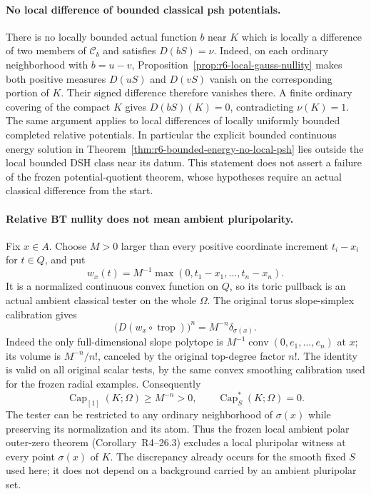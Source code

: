 \documentclass[11pt,a4paper]{article}
\numberwithin{equation}{section}
\theoremstyle{definition}
\theoremstyle{remark}
\begin{document}
\paragraph{No local difference of bounded classical psh potentials.}
There is no locally bounded actual function $b$ near $K$ which is
locally a difference of two members of $\mathcal C_b$ and satisfies
$D(bS)=\nu$. Indeed, on each ordinary neighborhood with
$b=u-v$, Proposition~\ref{prop:r6-local-gauss-nullity} makes both
positive measures $D(uS)$ and $D(vS)$ vanish on the corresponding
portion of $K$. Their signed difference therefore vanishes there.
A finite ordinary covering of the compact $K$ gives $D(bS)(K)=0$,
contradicting $\nu(K)=1$. The same argument applies to local
differences of locally uniformly bounded completed relative
potentials. In particular the explicit bounded continuous energy
solution in Theorem~\ref{thm:r6-bounded-energy-no-local-psh} lies
outside the local bounded DSH class near its datum. This statement
does not assert a failure of the frozen potential-quotient theorem,
whose hypotheses require an actual classical difference from the start.

\paragraph{Relative BT nullity does not mean ambient pluripolarity.}
Fix $x\in A$. Choose $M>0$ larger than every positive coordinate
increment $t_i-x_i$ for $t\in Q$, and put
\[
 w_x(t)=M^{-1}\max(0,t_1-x_1,\ldots,t_n-x_n).
\]
It is a normalized continuous convex function on $Q$, so its toric
pullback is an actual ambient classical tester on the whole $\Omega$.
The original torus slope-simplex calibration gives
\[
            \bigl(D(w_x\circ\operatorname{trop})\bigr)^n
                         =M^{-n}\delta_{\sigma(x)}.
\]
Indeed the only full-dimensional slope polytope is
$M^{-1}\operatorname{conv}(0,e_1,\ldots,e_n)$ at $x$; its volume
is $M^{-n}/n!$, canceled by the original top-degree factor $n!$.
The identity is valid on all original scalar tests, by the same
convex smoothing calibration used for the frozen radial examples.
Consequently
\[
             \operatorname{Cap}_{[1]}(K;\Omega)\ge M^{-n}>0,
                  \qquad \operatorname{Cap}_S^*(K;\Omega)=0.
\]
The tester can be restricted to any ordinary neighborhood of
$\sigma(x)$ while preserving its normalization and its atom.
Thus the frozen local ambient polar outer-zero theorem
(Corollary~\textup{R4--26.3}) excludes a local
pluripolar witness at every point $\sigma(x)$ of $K$. The discrepancy
already occurs for the smooth fixed $S$ used here; it does not depend
on a background carried by an ambient pluripolar set.
\end{document}
